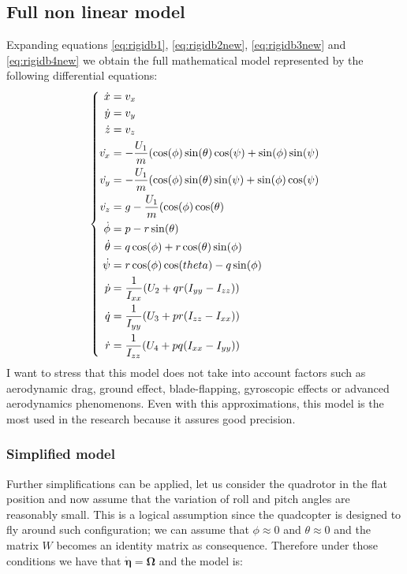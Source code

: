 \subsection*{Full non linear model}
Expanding equations \ref{eq:rigidb1}, \ref{eq:rigidb2new}, \ref{eq:rigidb3new} and \ref{eq:rigidb4new} we obtain the full mathematical model represented by the following differential equations:
\vspace{2ex}
\begin{equation}
\vspace{2ex}
\left\lbrace
	\begin{aligned}
		\dot{x}& = v_x \\
		\dot{y}& = v_y \\
		\dot{z}& = v_z \\
		\dot{v_x}& = -\frac{U_1}{m}(\cos(\phi)\sin(\theta)\cos(\psi) + \sin(\phi)\sin(\psi) \\
		\dot{v_y}& = -\frac{U_1}{m}(\cos(\phi)\sin(\theta)\sin(\psi) + \sin(\phi)\cos(\psi) \\
		\dot{v_z}& = g - \frac{U_1}{m}(\cos(\phi)\cos(\theta) \\
        \dot{\phi}& = p - r \sin(\theta) \\
        \dot{\theta}& = q \cos(\phi) + r\cos(\theta) \sin(\phi) \\
        \dot{\psi}& = r \cos(\phi) \cos(theta) - q \sin(\phi)\\
        \dot{p}& =\frac{1}{I_{xx}}(U_2 + qr(I_{yy} - I_{zz})) \\
        \dot{q}& =\frac{1}{I_{yy}}(U_3 + pr(I_{zz} - I_{xx})) \\
        \dot{r}& =\frac{1}{I_{zz}}(U_4 + pq(I_{xx} - I_{yy})) \\
     \end{aligned}
     \right.
\label{eq:mathfullmodel}
\end{equation}
I want to stress that this model does not take into account factors such as aerodynamic drag, ground effect, blade-flapping, gyroscopic effects or advanced aerodynamics phenomenons. Even with this approximations, this model is the most used in the research because it assures good precision.

\subsubsection*{Simplified model}
Further simplifications can be applied, let us consider the quadrotor in the flat position and now assume that the variation of roll and pitch angles are reasonably small. This is a logical assumption since the quadcopter is designed to fly around such configuration; we can assume that $\phi \approx 0$ and $\theta \approx 0$ and the matrix $W$ becomes an identity matrix as consequence. Therefore under those conditions we have that $\boldsymbol{\dot{\eta}} = \boldsymbol{\Omega}$ and the model is:

